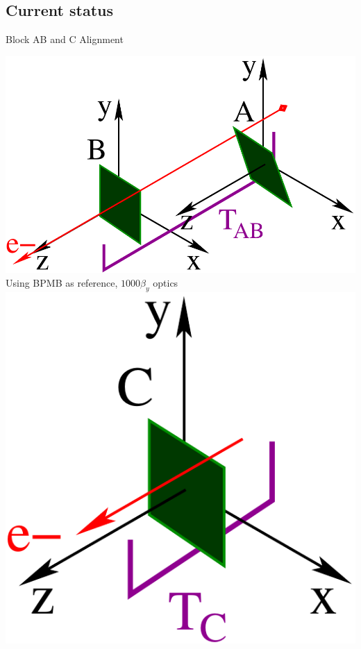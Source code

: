 \documentclass[a4paper,11pt]{book}
\begin{document}
\subsection{Current status}
Block AB and C Alignment\par
 \includegraphics[scale=0.3,angle=0]{fig20.pdf}\\
{\tiny Using BPMB as reference,  $1000\beta_y$ optics}
 \includegraphics[scale=0.3,angle=0]{fig28.pdf}\\
\end{document}
